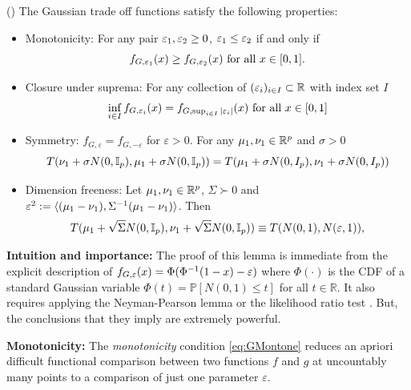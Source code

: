 \begin{lemma} (\cite{dong2022gaussian})\label{lem: GTOF} The Gaussian trade off functions satisfy the following properties:
\begin{itemize}
\item Monotonicity:  For any pair  $\varepsilon_1, \varepsilon_2  \geq0$, $\varepsilon_1 \leq \varepsilon_2$ if and only if  
\begin{equation} \label{eq:GMontone}
   f_{ G,\varepsilon_1}(x)  \geq f_{G,\varepsilon_2}(x) \text{ for all } x \in [0,1]. 
\end{equation}
\item Closure under suprema:  For any collection of $(\varepsilon_i)_{i\in I} \subset 
\mathbb{R}$ with index set $I$
\begin{equation} \label{eq:Gsuprema}
   \inf_{i\in I} f_{ G,\varepsilon_i}(x) = f_{G,\sup_{i\in I}|\varepsilon_i|}(x) \text{ for all } x \in [0,1]
\end{equation}
\item Symmetry: $f_{G,\varepsilon}= f_{G,-\varepsilon}$ for $\varepsilon >0$. For any  $\mu_1, \nu_1 \in \mathbb{R}^p$ and $\sigma >0$ 
\begin{equation} \label{eq:symmetry}
   T(\nu_1 + \sigma N(0, \mathbb{I}_p), \mu_1+ \sigma N(0, \mathbb{I}_p)) =   T(\mu_1+ \sigma N(0, I_p), \nu_1 + \sigma N(0, I_p))
\end{equation}
\item Dimension freeness: Let $\mu_1, \nu_1 \in \mathbb{R}^p$, $\Sigma  \succ 0$ and  $\varepsilon^2 := \langle (\mu_1- \nu_1), \Sigma^{-1} (\mu_1- \nu_1)\rangle $. Then
\begin{equation} \label{eq:dto1a}
    T(\mu_1+ \sqrt{\Sigma} N(0, \mathbb{I}_p), \nu_1 + \sqrt{\Sigma}N(0, \mathbb{I}_p)) \equiv T(N(0,1), N(\varepsilon, 1)), 
\end{equation}
\end{itemize}
 \end{lemma}
\textbf{Intuition and importance:} The proof of this lemma is immediate from the explicit description of $f_{G, \varepsilon}(x)=\Phi(\Phi^{-1}(1-x) - \varepsilon)$ where $\Phi(\cdot)$ is the CDF of a standard Gaussian variable $\Phi(t)= \mathbb{P}[N(0,1)\leq t]$ for all $t\in \mathbb{R}$. It also requires applying the Neyman-Pearson lemma or the likelihood ratio test \cite{polyanskiy_wu_2025}. But, the conclusions that they imply are extremely powerful. 
\par
\textbf{Monotonicity:} The \textit{monotonicity} condition \eqref{eq:GMontone} reduces an apriori difficult functional comparison between two functions $f$ and $g$ at uncountably many points to a comparison of just one parameter $\varepsilon$.
